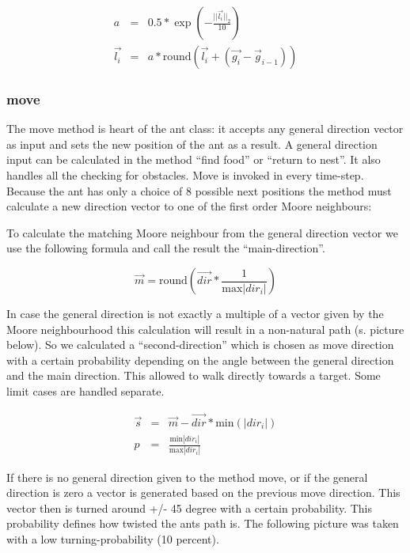 \documentclass[11pt]{article}
\begin{document}
\begin{eqnarray}
a & = & 0.5 * \exp \left(-\frac{||\vec{l_i}||_2}{10}\right) \\
\vec{l_i} & = & a * \text{round} \left(\vec{l_i}  + \left(\vec{g_i} - {\vec{g}_{i-1}}\right)\right)
\end{eqnarray}

\subsubsection{move} 
The move method is heart of the ant class: it accepts any general direction vector as input and sets the new position of the ant as a result. A general direction input can be calculated in the method “find food” or “return to nest”. It also handles all the checking for obstacles. Move is invoked in every time-step. Because the ant has only a choice of 8 possible next positions the method must calculate a new direction vector to one of the first order Moore neighbours:


To calculate the matching Moore neighbour from the general direction vector we use the following formula and call the result the “main-direction”.

\begin{equation}
\vec{m} = \text{round}\left(\vec{dir}*\frac{1}{\text{max}|dir_i|}\right)
\end{equation}

In case the general direction is not exactly a multiple of a vector given by the Moore neighbourhood this calculation will result in a non-natural path (s. picture below). So we calculated a “second-direction” which is chosen as move direction with a certain probability depending on the angle between the general direction and the main direction. This allowed to walk directly towards a target. Some limit cases are handled separate.

\begin{eqnarray}
\vec{s} & = & \vec{m}-\vec{dir} * \text{min} \left( |dir_i| \right) \\ 
p & = & \frac{\text{min}|dir_i|}{\text{max} |dir_i|}
\end{eqnarray}

If there is no general direction given to the method move, or if the general direction is zero a vector is generated based on the previous move direction. This vector then is turned around +/- 45 degree with a certain probability. This probability defines how twisted the ants path is. The following picture was taken with a low turning-probability (10 percent).
\end{document}
